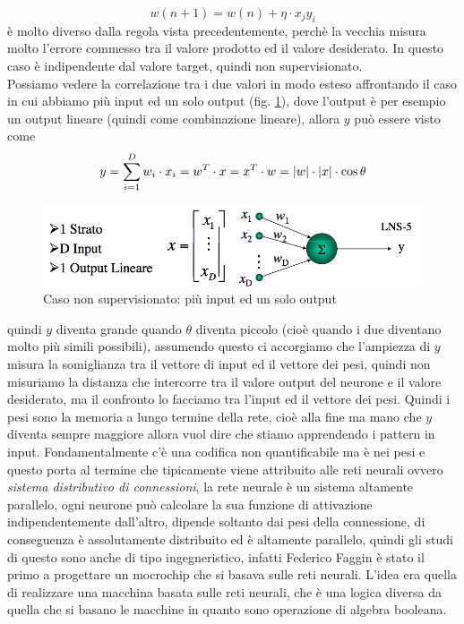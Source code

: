 \begin{equation}
w(n+1) = w(n) +  \eta \cdot x_j y_i
\end{equation}
è molto diverso dalla regola vista precedentemente, perchè la vecchia misura molto l'errore commesso tra il valore prodotto ed il valore desiderato. In questo caso è indipendente dal valore target, quindi non supervisionato.\\
\noindent 
Possiamo vedere la correlazione tra i due valori in modo esteso affrontando il caso in cui abbiamo più input ed un solo output (fig. \ref{fig1}), dove l'output è per esempio un output lineare (quindi come combinazione lineare), allora $y$ può essere visto come
\begin{equation}
y= \sum_{i=1}^D w_i \cdot x_i = w^T \cdot x = x^T \cdot w = \lvert w\rvert \cdot \lvert x\rvert \cdot \cos \theta
\end{equation}

\begin{figure}
\centering
\includegraphics[scale=0.5]{img/fig1.png}
\caption{Caso non supervisionato: più input ed un solo output}
\label{fig1}
\end{figure}

quindi $y$ diventa grande quando $\theta$ diventa piccolo (cioè quando i due diventano molto più simili possibili), assumendo questo ci accorgiamo che l'ampiezza di $y$ misura la somiglianza tra il vettore di input ed il vettore dei pesi, quindi non misuriamo la distanza che intercorre tra il valore output del neurone  e il valore desiderato, ma il confronto lo facciamo tra l'input ed il vettore dei pesi. Quindi i pesi sono la memoria a lungo termine della rete, cioè alla fine ma mano che $y$ diventa sempre maggiore allora vuol dire che stiamo apprendendo i pattern in input. Fondamentalmente c'è una codifica non quantificabile ma è nei pesi e questo porta al termine che tipicamente viene attribuito alle reti neurali ovvero \emph{sistema distributivo di connessioni}, la rete neurale è un sistema altamente parallelo, ogni neurone può calcolare la sua funzione di attivazione indipendentemente dall'altro, dipende soltanto dai pesi della connessione, di conseguenza è assolutamente distribuito ed è altamente parallelo, quindi gli studi di questo sono anche di tipo ingegneristico, infatti Federico Faggin è stato il primo a progettare un mocrochip che si basava sulle reti neurali. L'idea era quella di realizzare una macchina basata sulle reti neurali, che è una logica diversa da quella che si basano le macchine in quanto sono operazione di algebra booleana.\\

